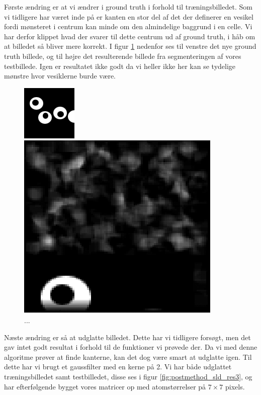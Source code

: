 Første ændring er at vi ændrer i ground truth i forhold til træningsbilledet. Som vi tidligere har været inde på er kanten en stor del af det der definerer en vesikel fordi mønsteret i centrum kan minde om den almindelige baggrund i en celle. Vi har derfor klippet hvad der svarer til dette centrum ud af ground truth, i håb om at billedet så bliver mere korrekt. I figur \ref{fig:postmethod_sld_gt4} nedenfor ses til venstre det nye ground truth billede, og til højre det resulterende billede fra segmenteringen af vores testbillede. Igen er resultatet ikke godt da vi heller ikke her kan se tydelige mønstre hvor vesiklerne burde være.

\begin{figure}[H]
	\begin{minipage}[b]{0.5\linewidth}
		\centering
		\includegraphics[scale=3]{files/postmethod/img/imGT3.png}
	\end{minipage}
	\hspace{0.8cm}
	\begin{minipage}[b]{0.5\linewidth}
		\centering
		\includegraphics[scale=0.42]{files/postmethod/img/sld_res3.png}
	\end{minipage}
	\caption{...\label{fig:postmethod_sld_gt4}}
\end{figure}

Næste ændring er så at udglatte billedet. Dette har vi tidligere forsøgt, men det gav intet godt resultat i forhold til de funktioner vi prøvede der. %
Da vi med denne algoritme prøver at finde kanterne, kan det dog være smart at udglatte igen. Til dette har vi brugt et gaussfilter med en kerne på 2. %
Vi har både udglattet træningsbilledet samt testbilledet, disse ses i figur \ref{fig:postmethod_sld_res3}, og har efterfølgende bygget vores matricer op med atomstørrelser på $7\times7$ pixels.

